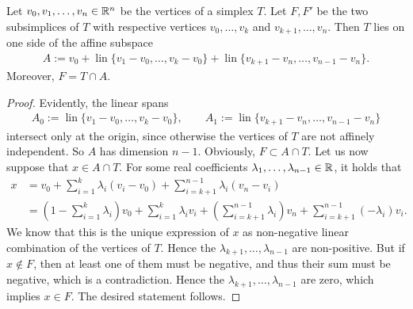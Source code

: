 \documentclass[10pt,letterpaper]{article}
\begin{document}
\begin{lemma}\label{lemma:oppositesubsimplex}
    Let $v_0, v_1, \dots, v_n \in {\mathbb R}^n$ be the vertices of a simplex $T$.
    Let $F, F'$ be the two subsimplices of $T$ with respective vertices $v_0,\dots,v_k$ and $v_{k+1},\dots,v_n$.
    Then $T$ lies on one side of the affine subspace
    \begin{gather*}
        A 
        := 
        v_0 
        + 
        \operatorname{lin}\{ v_1 - v_0, \dots, v_k - v_0 \} 
        +  
        \operatorname{lin}\{ v_{k+1} - v_n, \dots, v_{n-1} - v_n \}.
    \end{gather*}
    Moreover, $F = T \cap A$.
\end{lemma}
\begin{proof}
    Evidently, the linear spans 
    \begin{gather*}
        A_{0} := \operatorname{lin}\{ v_1 - v_0, \dots, v_k - v_0 \},
        \qquad 
        A_{1} := \operatorname{lin}\{ v_{k+1} - v_n, \dots, v_{n-1} - v_n \}
    \end{gather*}
    intersect only at the origin, since otherwise the vertices of $T$ are not affinely independent. 
    So $A$ has dimension $n-1$. 
    Obviously, $F \subset A \cap T$. 
    Let us now suppose that $x \in A \cap T$.
    For some real coefficients $\lambda_1,\dots,\lambda_{n-1} \in {\mathbb R}$, it holds that 
    \begin{align*}
        x &= 
        v_0 + \sum_{i=1}^{k} \lambda_{i} ( v_i - v_0 ) + \sum_{i=k+1}^{n-1} \lambda_{i} ( v_n - v_i )
        \\&
        = 
        \left( 1 - \sum_{i=1}^{k} \lambda_{i} \right) v_0 
        + 
        \sum_{i=1  }^{k  } \lambda_{i} v_i 
        + 
        \left( \sum_{i=k+1}^{n-1} \lambda_{i} \right) v_n
        + 
        \sum_{i=k+1}^{n-1} (-\lambda_{i}) v_i 
        .
    \end{align*}
    We know that this is the unique expression of $x$ as non-negative linear combination of the vertices of $T$.
    Hence the $\lambda_{k+1}, \dots, \lambda_{n-1}$ are non-positive.
    But if $x \notin F$, then at least one of them must be negative,
    and thus their sum must be negative, which is a contradiction. 
    Hence the $\lambda_{k+1}, \dots, \lambda_{n-1}$ are zero,
    which implies $x \in F$.
    The desired statement follows.         
\end{proof}
\end{document}
